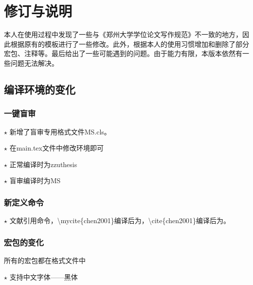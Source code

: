 \chapter{修订与说明}
\label{cha:change}

本人在使用过程中发现了一些与《郑州大学学位论文写作规范》不一致的地方，因此根据原有的模板进行了一些修改。此外，根据本人的使用习惯增加和删除了部分宏包、注释等。最后给出了一些可能遇到的问题。由于能力有限，本版本依然有一些问题无法解决。


\section{编译环境的变化}
\subsection{一键盲审}
$\star$ 新增了盲审专用格式文件{\color{blue}MS.cls}。

$\star$ 在{\color{blue}main.tex}文件中修改环境即可

$\star$ 正常编译时为zzuthesis

$\star$ 盲审编译时为MS


\subsection{新定义命令}
$\star$ 文献引用命令，{\color{blue}\textbackslash mycite\{chen2001\}}编译后为，{\color{blue}\textbackslash cite\{chen2001\}}编译后为\cite{chen2001}。
\begin{latex}
    \newcommand{\mycite}[1]{\scalebox{1.3}[1.3]{\raisebox{-0.65ex}{\cite{#1}}}}
\end{latex}



\subsection{宏包的变化}

所有的宏包都在{\color{blue}{.cls}}格式文件中

$\star $ 支持中文字体——{\heiti 黑体}
\begin{latex}
    \RequirePackage{xeCJK}
\end{latex}

